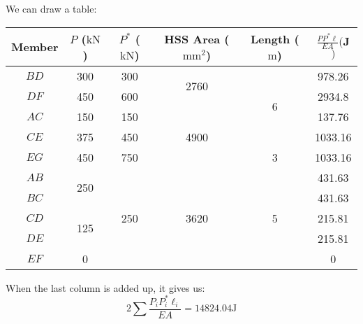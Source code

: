 \documentclass{article}
\begin{document}
We can draw a table:
\begin{center}
  \begin{tabular}{|c|c|c|c|c|c|}
    \hline
    Member & $P$ ($\si{\kilo\newton}$) & $P^*$ ($\si{\kilo\newton}$) & HSS Area ($\si{\milli\meter\squared}$) & Length ($\si{\meter}$) & $\frac{PP^*\ell}{EA} ($\si{\joule}$)$ \\ \hline
    $BD$ &         300          &          300            & \multirow{2}{*}{2760} & \multirow{4}{*}{6} &          978.26             \\ \cline{1-3} \cline{6-6} 
    $DF$ &         450          &          600            &                       &                    &          2934.8            \\ \cline{1-4} \cline{6-6} 
    $AC$ &         150          &          150            & \multirow{3}{*}{4900} &                    &          137.76             \\ \cline{1-3} \cline{6-6} 
    $CE$ &         375          &          450            &                       &                    &          1033.16            \\ \cline{1-3} \cline{5-6} 
    $EG$ &         450          &          750            &                       &         3          &          1033.16            \\ \hline
    $AB$ & \multirow{2}{*}{250} & \multirow{5}{*}{250}    & \multirow{5}{*}{3620} & \multirow{5}{*}{5} &          431.63             \\ \cline{1-1} \cline{6-6} 
    $BC$ &                      &                         &                       &                    &          431.63             \\ \cline{1-2} \cline{6-6} 
    $CD$ & \multirow{2}{*}{125} &                         &                       &                    &          215.81             \\ \cline{1-1} \cline{6-6} 
    $DE$ &                      &                         &                       &                    &          215.81             \\ \cline{1-2} \cline{6-6} 
    $EF$ &           0          &                         &                       &                    &          0                  \\ \hline
    \end{tabular}
\end{center}
When the last column is added up, it gives us:
\begin{equation}
  2\sum \frac{P_iP_i^* \ell_i}{EA} = 14824.04 \si{\joule}
  \label{eq:}
\end{equation}
\end{document}
